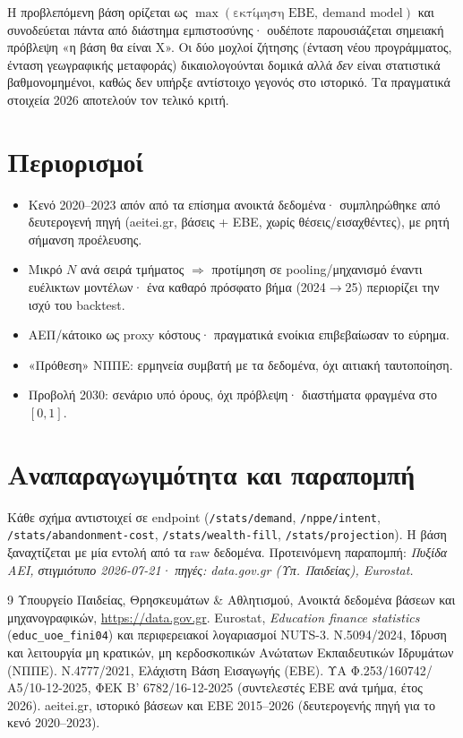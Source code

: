 \documentclass[11pt]{article}
\begin{document}
Η προβλεπόμενη βάση ορίζεται ως $\max(\text{εκτίμηση ΕΒΕ},\ \text{demand model})$
και συνοδεύεται πάντα από διάστημα εμπιστοσύνης· ουδέποτε παρουσιάζεται σημειακή
πρόβλεψη «η βάση θα είναι X». Οι δύο μοχλοί ζήτησης (ένταση νέου προγράμματος,
ένταση γεωγραφικής μεταφοράς) δικαιολογούνται δομικά αλλά \emph{δεν} είναι
στατιστικά βαθμονομημένοι, καθώς δεν υπήρξε αντίστοιχο γεγονός στο ιστορικό. Τα
πραγματικά στοιχεία 2026 αποτελούν τον τελικό κριτή.

\section{Περιορισμοί}
\begin{itemize}[leftmargin=1.4em,itemsep=1pt]
\item Κενό 2020--2023 απόν από τα επίσημα ανοικτά δεδομένα· συμπληρώθηκε από
δευτερογενή πηγή (aeitei.gr, βάσεις + ΕΒΕ, χωρίς θέσεις/εισαχθέντες), με ρητή
σήμανση προέλευσης.
\item Μικρό $N$ ανά σειρά τμήματος $\Rightarrow$ προτίμηση σε pooling/μηχανισμό
έναντι ευέλικτων μοντέλων· ένα καθαρό πρόσφατο βήμα (2024$\to$25) περιορίζει την
ισχύ του backtest.
\item ΑΕΠ/κάτοικο ως proxy κόστους· πραγματικά ενοίκια επιβεβαίωσαν το εύρημα.
\item «Πρόθεση» ΝΠΠΕ: ερμηνεία συμβατή με τα δεδομένα, όχι αιτιακή ταυτοποίηση.
\item Προβολή 2030: σενάριο υπό όρους, όχι πρόβλεψη· διαστήματα φραγμένα στο $[0,1]$.
\end{itemize}

\section{Αναπαραγωγιμότητα και παραπομπή}

Κάθε σχήμα αντιστοιχεί σε endpoint (\texttt{/stats/demand}, \texttt{/nppe/intent},
\texttt{/stats/abandonment-cost}, \texttt{/stats/wealth-fill},
\texttt{/stats/projection}). Η βάση ξαναχτίζεται με μία εντολή από τα raw
δεδομένα. Προτεινόμενη παραπομπή: \emph{Πυξίδα ΑΕΙ, στιγμιότυπο 2026-07-21· πηγές:
data.gov.gr (Υπ. Παιδείας), Eurostat.}

\begin{thebibliography}{9}
 Υπουργείο Παιδείας, Θρησκευμάτων \& Αθλητισμού, Ανοικτά
δεδομένα βάσεων και μηχανογραφικών, \url{https://data.gov.gr}.
 Eurostat, \emph{Education finance statistics}
(\texttt{educ\_uoe\_fini04}) και περιφερειακοί λογαριασμοί NUTS-3.
 Ν.5094/2024, Ίδρυση και λειτουργία μη κρατικών, μη κερδοσκοπικών
Ανώτατων Εκπαιδευτικών Ιδρυμάτων (ΝΠΠΕ).
 Ν.4777/2021, Ελάχιστη Βάση Εισαγωγής (ΕΒΕ).
 ΥΑ Φ.253/160742/Α5/10-12-2025, ΦΕΚ Β' 6782/16-12-2025
(συντελεστές ΕΒΕ ανά τμήμα, έτος 2026).
 aeitei.gr, ιστορικό βάσεων και ΕΒΕ 2015--2026 (δευτερογενής
πηγή για το κενό 2020--2023).
\end{thebibliography}
\end{document}

